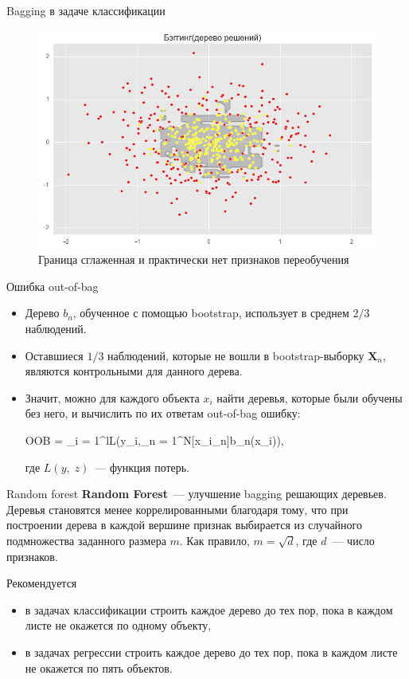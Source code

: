 \documentclass[notheorems, handout]{beamer}
\begin{document}
\begin{frame}{Bagging в задаче классификации}
\begin{figure}[h!]
  \includegraphics[width=1 \textwidth]{img/bagging_cl}
 \caption{Граница сглаженная и практически нет признаков переобучения}
\end{figure}
\end{frame}

\begin{frame}{Ошибка out-of-bag}
\begin{itemize}
	\item Дерево $b_{n}$, обученное с помощью bootstrap, использует в среднем $2/3$ наблюдений.
	\item Оставшиеся $1/3$ наблюдений, которые не вошли в bootstrap-выборку $\mathbf{X}_{n}$, являются контрольными для данного дерева.
	\item Значит, можно для каждого объекта $x_{i}$ найти деревья, которые были обучены без него, и вычислить по их ответам out-of-bag ошибку:
		\begin{flalign*}
			OOB = \displaystyle\sum_{i = 1}^{l}L\left(y_{i},\;\displaystyle\sum_{n = 1}^{N}[x_{i}\notin{}_{n}]b_{n}(x_{i})\right),
		\end{flalign*}
где $L(y,\; z)$~--- функция потерь.
\end{itemize}
\end{frame}

\begin{frame}{Random forest}
\textbf{Random Forest}~--- улучшение bagging решающих деревьев. Деревья становятся менее коррелированными благодаря тому, что при построении дерева в каждой вершине признак выбирается из случайного подмножества заданного размера $m$. Как правило, $m = \sqrt{d}$, где $d$~--- число признаков.
\par\smallskip
Рекомендуется
\begin{itemize}
	\item в задачах классификации строить каждое дерево до тех пор, пока в каждом листе не окажется по одному объекту,
	\item в задачах регрессии строить каждое дерево до тех пор, пока в каждом листе не окажется по пять объектов.
\end{itemize}
\end{frame}
\end{document}
